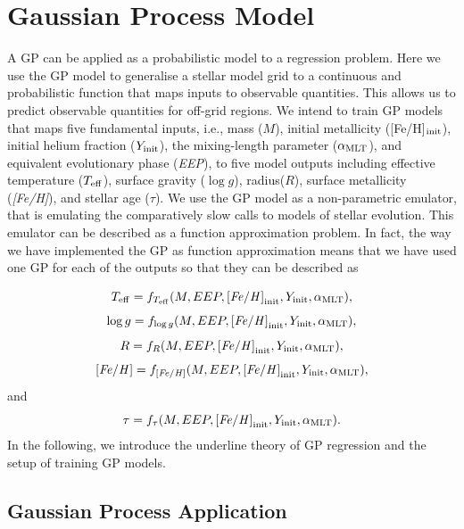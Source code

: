 \section{Gaussian Process Model}\label{sec:gpmodel}
A GP can be applied as a probabilistic model to a regression problem.  Here we use the GP model to generalise a stellar model grid to a continuous and probabilistic function that maps inputs to observable quantities.  This allows us to predict observable quantities for off-grid regions.
%
We intend to train GP models that maps five fundamental inputs,  i.e., mass ($M$), initial metallicity ([Fe/H]$_{\rm init}$), initial helium fraction ($Y_{\rm init}$), the mixing-length parameter ($\alpha_{\rm MLT}$), and equivalent evolutionary phase ({\it EEP}), to five model outputs including effective temperature ($T_{\rm eff}$), surface gravity ($\log g$), radius($R$), surface metallicity ({\it [Fe/H]}), and stellar age ($\tau$). We use the GP model as a non-parametric emulator, that is emulating the comparatively slow calls to models of stellar evolution.
This emulator can be described as a function approximation problem. In fact, the way we have implemented the GP as function approximation means that we have used one GP for each of the outputs so that they can be described as

\begin{equation}\label{gprmodel1}
{T_{\rm eff}} = f_{T_{\rm eff}}(M, EEP, {\it [Fe/H]}_{\rm init}, Y_{\rm init}, \alpha_{\rm MLT}),
\end{equation}
\begin{equation}\label{gprmodel1}
{\log g} = f_{\log g}(M, EEP, {\it [Fe/H]}_{\rm init}, Y_{\rm init}, \alpha_{\rm MLT}),
\end{equation}
\begin{equation}\label{gprmodel1}
{R} = f_{R}(M, EEP, {\it [Fe/H]}_{\rm init}, Y_{\rm init}, \alpha_{\rm MLT}),
\end{equation}
\begin{equation}\label{gprmodel1}
{\it [Fe/H]} = f_{\it [Fe/H]}(M, EEP, {\it [Fe/H]}_{\rm init}, Y_{\rm init}, \alpha_{\rm MLT}),
\end{equation}
and 
\begin{equation}\label{gprmodel1}
{\tau} = f_{\tau}(M, EEP, {\it [Fe/H]}_{\rm init}, Y_{\rm init}, \alpha_{\rm MLT}).
\end{equation}
In the following, we introduce the underline theory of GP regression and the setup of training GP models.  


\subsection{Gaussian Process Application}

